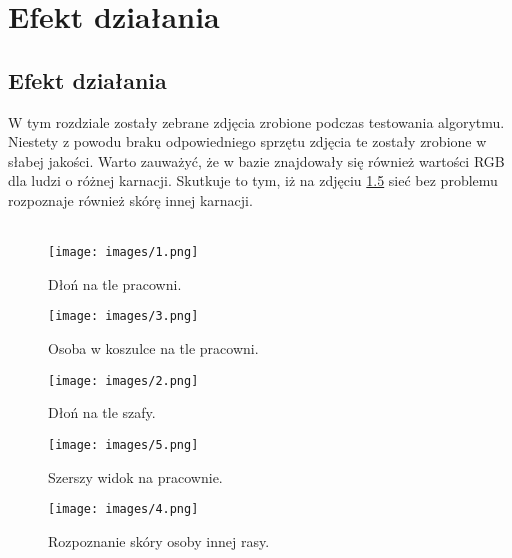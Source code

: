\chapter{Efekt działania}
\label{cha:efekt}



\section{Efekt działania}
W tym rozdziale zostały zebrane zdjęcia zrobione podczas testowania algorytmu. Niestety z powodu braku odpowiedniego sprzętu zdjęcia te zostały zrobione w słabej jakości. Warto zauważyć, że w bazie znajdowały się również wartości RGB dla ludzi o różnej karnacji. Skutkuje to tym, iż na zdjęciu \ref{fig:5} sieć bez problemu rozpoznaje również skórę innej karnacji.\\ \\ 
\begin{figure}[tbph!]
\centering
\texttt{[image: images/1.png]}
\caption{Dłoń na tle pracowni.}
\label{fig:1}
\end{figure}
\begin{figure}[tbph!]
\centering
\texttt{[image: images/3.png]}
\caption{Osoba w koszulce na tle pracowni.}
\label{fig:2}
\end{figure}
\begin{figure}[tbph!]
\centering
\texttt{[image: images/2.png]}
\caption{Dłoń na tle szafy.}
\label{fig:3}
\end{figure}
\begin{figure}[tbph!]
\centering
\texttt{[image: images/5.png]}
\caption{Szerszy widok na pracownie.}
\label{fig:4}
\end{figure}
\begin{figure}[tbph!]
\centering
\texttt{[image: images/4.png]}
\caption{Rozpoznanie skóry osoby innej rasy.}
\label{fig:5}
\end{figure}
